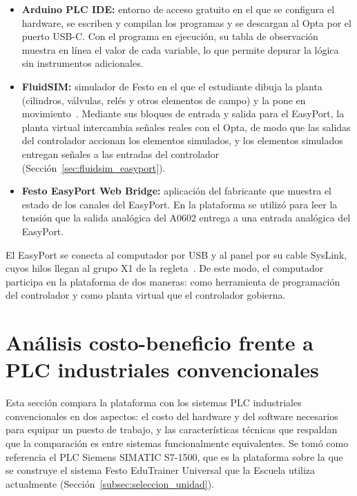 \documentclass[12pt,a4paper,oneside]{report}
\begin{document}
\begin{itemize}
    \item \textbf{Arduino PLC IDE:} entorno de acceso gratuito en el que se configura el hardware, se escriben y compilan los programas y se descargan al Opta por el puerto USB-C. Con el programa en ejecución, su tabla de observación muestra en línea el valor de cada variable, lo que permite depurar la lógica sin instrumentos adicionales.
    \item \textbf{FluidSIM:} simulador de Festo en el que el estudiante dibuja la planta (cilindros, válvulas, relés y otros elementos de campo) y la pone en movimiento~\cite{ref28}. Mediante sus bloques de entrada y salida para el EasyPort, la planta virtual intercambia señales reales con el Opta, de modo que las salidas del controlador accionan los elementos simulados, y los elementos simulados entregan señales a las entradas del controlador (Sección~\ref{sec:fluidsim_easyport}).
    \item \textbf{Festo EasyPort Web Bridge:} aplicación del fabricante que muestra el estado de los canales del EasyPort. En la plataforma se utilizó para leer la tensión que la salida analógica del A0602 entrega a una entrada analógica del EasyPort.
\end{itemize}

El EasyPort se conecta al computador por USB y al panel por su cable SysLink, cuyos hilos llegan al grupo X1 de la regleta~\cite{ref27}. De este modo, el computador participa en la plataforma de dos maneras: como herramienta de programación del controlador y como planta virtual que el controlador gobierna.

\section{Análisis costo-beneficio frente a PLC industriales convencionales}
\label{sec:costo_beneficio}

Esta sección compara la plataforma con los sistemas PLC industriales convencionales en dos aspectos: el costo del hardware y del software necesarios para equipar un puesto de trabajo, y las características técnicas que respaldan que la comparación es entre sistemas funcionalmente equivalentes. Se tomó como referencia el PLC Siemens SIMATIC S7-1500, que es la plataforma sobre la que se construye el sistema Festo EduTrainer Universal que la Escuela utiliza actualmente (Sección~\ref{subsec:seleccion_unidad}).
\end{document}
